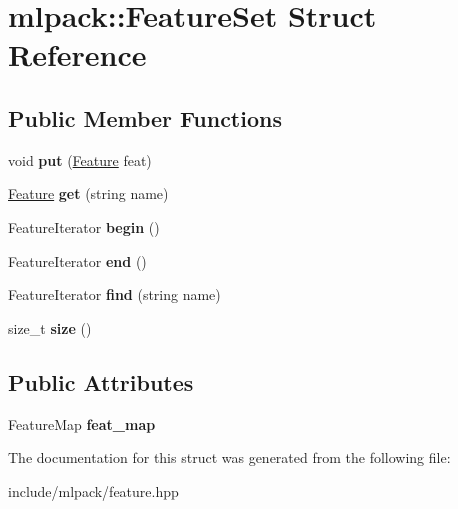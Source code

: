 \hypertarget{structmlpack_1_1_feature_set}{
\section{mlpack::FeatureSet Struct Reference}
\label{structmlpack_1_1_feature_set}
}
\subsection*{Public Member Functions}
\begin{DoxyCompactItemize}
\item 
\hypertarget{structmlpack_1_1_feature_set_a7ddcbd5e1cd3cc2395ca5cef9884fbda}{
void {\bfseries put} (\hyperlink{structmlpack_1_1_feature}{Feature} feat)}
\label{structmlpack_1_1_feature_set_a7ddcbd5e1cd3cc2395ca5cef9884fbda}

\item 
\hypertarget{structmlpack_1_1_feature_set_a478c03c6f3111ad4e43f18bab61dbea8}{
\hyperlink{structmlpack_1_1_feature}{Feature} {\bfseries get} (string name)}
\label{structmlpack_1_1_feature_set_a478c03c6f3111ad4e43f18bab61dbea8}

\item 
\hypertarget{structmlpack_1_1_feature_set_afc59ed95c07ebee674ff57dd793897bd}{
FeatureIterator {\bfseries begin} ()}
\label{structmlpack_1_1_feature_set_afc59ed95c07ebee674ff57dd793897bd}

\item 
\hypertarget{structmlpack_1_1_feature_set_a28c6f535c55cfc2411594a1c04ffd4b8}{
FeatureIterator {\bfseries end} ()}
\label{structmlpack_1_1_feature_set_a28c6f535c55cfc2411594a1c04ffd4b8}

\item 
\hypertarget{structmlpack_1_1_feature_set_a03f6ef5d3ed15477f6be98b00d6bc3bd}{
FeatureIterator {\bfseries find} (string name)}
\label{structmlpack_1_1_feature_set_a03f6ef5d3ed15477f6be98b00d6bc3bd}

\item 
\hypertarget{structmlpack_1_1_feature_set_a3ede7a822cc52868f47a3b68f1bb3737}{
size\_\-t {\bfseries size} ()}
\label{structmlpack_1_1_feature_set_a3ede7a822cc52868f47a3b68f1bb3737}

\end{DoxyCompactItemize}
\subsection*{Public Attributes}
\begin{DoxyCompactItemize}
\item 
\hypertarget{structmlpack_1_1_feature_set_a60be60b4b309eb16b09e8459ac8414d2}{
FeatureMap {\bfseries feat\_\-map}}
\label{structmlpack_1_1_feature_set_a60be60b4b309eb16b09e8459ac8414d2}

\end{DoxyCompactItemize}


The documentation for this struct was generated from the following file:\begin{DoxyCompactItemize}
\item 
include/mlpack/feature.hpp\end{DoxyCompactItemize}
